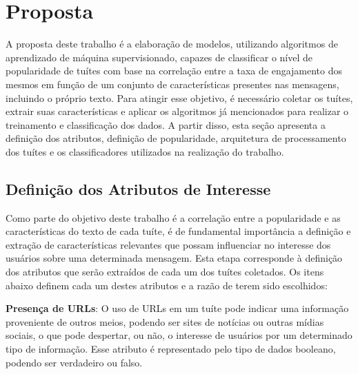 \documentclass[oneside,openright,12pt]{ufsm_2015} %
\begin{document}

\chapter{Proposta}
\label{sec:proposta}

    \par A proposta deste trabalho é a elaboração de modelos, utilizando algoritmos de aprendizado de máquina supervisionado, capazes de classificar o nível de popularidade de tuítes com base na correlação entre a taxa de engajamento dos mesmos em função de um conjunto de características presentes nas mensagens, incluindo o próprio texto. Para atingir esse objetivo, é necessário coletar os tuítes, extrair suas características e aplicar os algoritmos já mencionados para realizar o treinamento e classificação dos dados. A partir disso, esta seção apresenta a definição dos atributos, definição de popularidade, arquitetura de processamento dos tuítes e os classificadores utilizados na realização do trabalho.


\section{Definição dos Atributos de Interesse}
\label{sec:prop-def-atributos}

    \par Como parte do objetivo deste trabalho é a correlação entre a popularidade e as características do texto de cada tuíte, é de fundamental importância a definição e extração de características relevantes que possam influenciar no interesse dos usuários sobre uma determinada mensagem. Esta etapa corresponde à definição dos atributos que serão extraídos de cada um dos tuítes coletados. Os itens abaixo definem cada um destes atributos e a razão de terem sido escolhidos:

    \par \textbf{Presença de URLs}: O uso de URLs em um tuíte pode indicar uma informação proveniente de outros meios, podendo ser sites de notícias ou outras mídias sociais, o que pode despertar, ou não, o interesse de usuários por um determinado tipo de informação. Esse atributo é representado pelo tipo de dados booleano, podendo ser verdadeiro ou falso.
\end{document}
